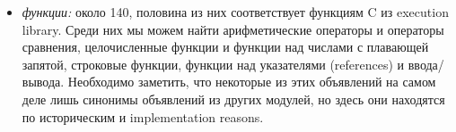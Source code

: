 \begin{itemize}
\begin{itemize}
	\end{itemize}

	\item {\it функции:} около 140, половина из них соответствует функциям C из 
execution library. Среди них мы можем найти арифметические операторы и операторы 
сравнения, целочисленные функции и функции над числами с плавающей запятой, 
строковые функции, функции над указателями (references) и ввода/вывода. 
Необходимо заметить, что некоторые из этих объявлений на самом деле лишь 
синонимы объявлений из других модулей, но здесь они находятся по историческим и 
implementation reasons.

\end{itemize}

